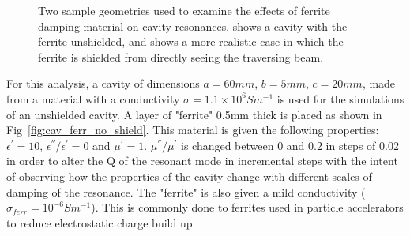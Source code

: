 \begin{figure}
\begin{center}

\end{center}
\caption{Two sample geometries used to examine the effects of ferrite damping material on cavity resonances.  shows a cavity with the ferrite unshielded, and  shows a more realistic case in which the ferrite is shielded from directly seeing the traversing beam.}
\label{fig:ferr_cav_res}
\end{figure}

For this analysis, a cavity of dimensions $a=60mm$, $b=5mm$, $c=20mm$, made from a material with a conductivity $\sigma = 1.1 \times 10^{6} S m^{-1}$ is used for the simulations of an unshielded cavity. A layer of "ferrite" 0.5mm thick is placed as shown in Fig~\ref{fig:cav_ferr_no_shield}. This material is given the following properties: $\epsilon^{'} = 10$, $\epsilon^{''}/\epsilon^{'} = 0$ and $\mu^{'}=1$. $\mu^{''}/ \mu^{'}$ is changed between 0 and 0.2 in steps of 0.02 in order to alter the Q of the resonant mode in incremental steps with the intent of observing how the properties of the cavity change with different scales of damping of the resonance. The "ferrite" is also given a mild conductivity ($\sigma_{ferr} = 10^{-6} S m^{-1}$). This is commonly done to ferrites used in particle accelerators to reduce electrostatic charge build up. 

